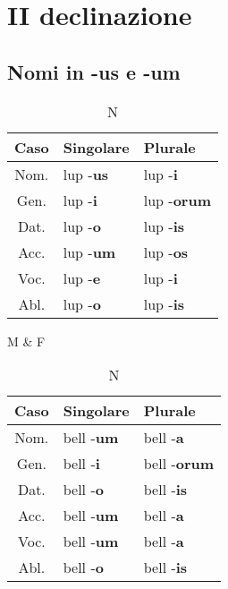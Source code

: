 \section{II declinazione}
\subsection{Nomi in -us e -um}
\begin{table}[h!]
    \begin{minipage}{.4\linewidth}
        \centering
        \begin{tabular}{|c|l|l|}
            \hline
            \textbf{Caso} & \textbf{Singolare} & \textbf{Plurale} \\
            \hline
            Nom. & lup -\textbf{us} & lup -\textbf{i} \\
            \hline
            Gen. & lup -\textbf{i}  & lup -\textbf{orum} \\
            \hline
            Dat. & lup -\textbf{o}  & lup -\textbf{is} \\
            \hline
            Acc. & lup -\textbf{um} & lup -\textbf{os} \\
            \hline
            Voc. & lup -\textbf{e}  & lup -\textbf{i} \\
            \hline
            Abl. & lup -\textbf{o}  & lup -\textbf{is} \\
            \hline
        \end{tabular}
        \caption{M \& F}
    \end{minipage}
    \hfill
    \begin{minipage}{.4\linewidth}
        \centering
        \begin{tabular}{|c|l|l|}
            \hline
            \textbf{Caso} & \textbf{Singolare} & \textbf{Plurale} \\
            \hline
            Nom. & bell -\textbf{um} & bell -\textbf{a} \\
            \hline
            Gen. & bell -\textbf{i}  & bell -\textbf{orum} \\
            \hline
            Dat. & bell -\textbf{o}  & bell -\textbf{is} \\
            \hline
            Acc. & bell -\textbf{um} & bell -\textbf{a} \\
            \hline
            Voc. & bell -\textbf{um} & bell -\textbf{a} \\
            \hline
            Abl. & bell -\textbf{o}  & bell -\textbf{is} \\
            \hline
        \end{tabular}
        \caption{N}
    \end{minipage}
\end{table}

